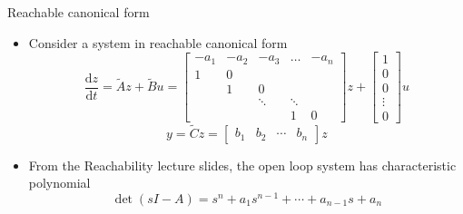 \documentclass{beamer-control}
\begin{document}

\begin{frame}{Reachable canonical form}
\begin{itemize}
\item Consider a system in reachable canonical form
\[\frac{\mathrm{d} z}{\mathrm{d} t}=\tilde{A} z+\tilde{B} u=\begin{bmatrix}
	-a_1 & -a_2 & -a_3 & \ldots & -a_n \\
	1 & 0 & & &  \\
	& 1 & 0 & & \\
	& & \ddots & \ddots & \\
	& & & 1 & 0
\end{bmatrix} z+\begin{bmatrix}
	1 \\
	0 \\
	0 \\
	\vdots \\
	0
\end{bmatrix} u\]
\[  y=\tilde{C} z=\begin{bmatrix}
	b_1 & b_2 & \cdots & b_n
\end{bmatrix}z \]
\item From the Reachability lecture slides, the open loop system has characteristic polynomial
\[\operatorname{det}(sI-A) = s^n+a_1s^{n-1}+\cdots + a_{n-1}s+a_n\]
\end{itemize}
\end{frame}
\end{document}
